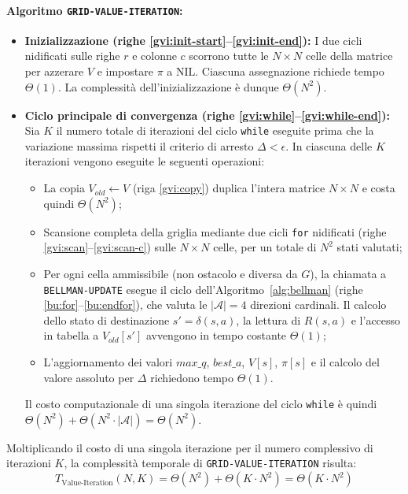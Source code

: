 \paragraph{Algoritmo \texttt{GRID-VALUE-ITERATION}:}
\begin{itemize}
    \item \textbf{Inizializzazione (righe \ref{gvi:init-start}--\ref{gvi:init-end}):} I due cicli nidificati sulle righe $r$ e colonne $c$ scorrono tutte le $N \times N$ celle della matrice per azzerare $V$ e impostare $\pi$ a $\text{NIL}$. Ciascuna assegnazione richiede tempo $\Theta(1)$. La complessità dell'inizializzazione è dunque $\Theta(N^2)$.
    \item \textbf{Ciclo principale di convergenza (righe \ref{gvi:while}--\ref{gvi:while-end}):} Sia $K$ il numero totale di iterazioni del ciclo \texttt{while} eseguite prima che la variazione massima rispetti il criterio di arresto $\Delta < \epsilon$. In ciascuna delle $K$ iterazioni vengono eseguite le seguenti operazioni:
    \begin{itemize}
        \item La copia $V_{old} \gets V$ (riga \ref{gvi:copy}) duplica l'intera matrice $N \times N$ e costa quindi $\Theta(N^2)$;
        \item Scansione completa della griglia mediante due cicli \texttt{for} nidificati (righe \ref{gvi:scan}--\ref{gvi:scan-c}) sulle $N \times N$ celle, per un totale di $N^2$ stati valutati;
        \item Per ogni cella ammissibile (non ostacolo e diversa da $G$), la chiamata a \texttt{BELLMAN-UPDATE} esegue il ciclo dell'Algoritmo~\ref{alg:bellman} (righe \ref{bu:for}--\ref{bu:endfor}), che valuta le $|\mathcal{A}| = 4$ direzioni cardinali. Il calcolo dello stato di destinazione $s' = \delta(s,a)$, la lettura di $R(s,a)$ e l'accesso in tabella a $V_{old}[s']$ avvengono in tempo costante $\Theta(1)$;
        \item L'aggiornamento dei valori $max\_q$, $best\_a$, $V[s]$, $\pi[s]$ e il calcolo del valore assoluto per $\Delta$ richiedono tempo $\Theta(1)$.
    \end{itemize}
    Il costo computazionale di una singola iterazione del ciclo \texttt{while} è quindi $\Theta(N^2) + \Theta(N^2 \cdot |\mathcal{A}|) = \Theta(N^2)$.
\end{itemize}

\noindent
Moltiplicando il costo di una singola iterazione per il numero complessivo di iterazioni $K$, la complessità temporale di \texttt{GRID-VALUE-ITERATION} risulta:
\[
T_{\text{Value-Iteration}}(N, K) = \Theta(N^2) + \Theta(K \cdot N^2) = \Theta(K \cdot N^2)
\]

